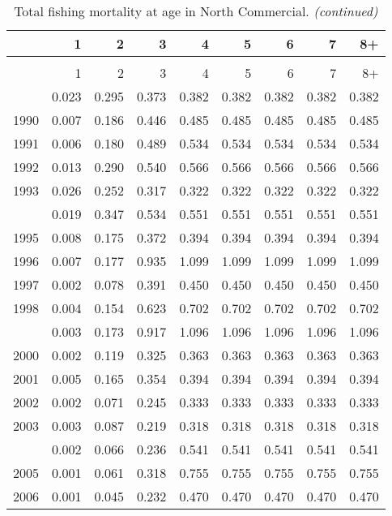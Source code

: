 \documentclass[
]{article}
\begin{document}
\begin{longtable}[t]{lrrrrrrrr}
\caption{\label{tab:North_Commercial-fleet-FAA-table}Total fishing mortality at age in North Commercial.}\\
\toprule
  & 1 & 2 & 3 & 4 & 5 & 6 & 7 & 8+\\
\midrule
\endfirsthead
\caption[]{Total fishing mortality at age in North Commercial. \textit{(continued)}}\\
\toprule
  & 1 & 2 & 3 & 4 & 5 & 6 & 7 & 8+\\
\midrule
\endhead

\endfoot
\bottomrule
\endlastfoot
1989 & 0.023 & 0.295 & 0.373 & 0.382 & 0.382 & 0.382 & 0.382 & 0.382\\
1990 & 0.007 & 0.186 & 0.446 & 0.485 & 0.485 & 0.485 & 0.485 & 0.485\\
1991 & 0.006 & 0.180 & 0.489 & 0.534 & 0.534 & 0.534 & 0.534 & 0.534\\
1992 & 0.013 & 0.290 & 0.540 & 0.566 & 0.566 & 0.566 & 0.566 & 0.566\\
1993 & 0.026 & 0.252 & 0.317 & 0.322 & 0.322 & 0.322 & 0.322 & 0.322\\
\addlinespace
1994 & 0.019 & 0.347 & 0.534 & 0.551 & 0.551 & 0.551 & 0.551 & 0.551\\
1995 & 0.008 & 0.175 & 0.372 & 0.394 & 0.394 & 0.394 & 0.394 & 0.394\\
1996 & 0.007 & 0.177 & 0.935 & 1.099 & 1.099 & 1.099 & 1.099 & 1.099\\
1997 & 0.002 & 0.078 & 0.391 & 0.450 & 0.450 & 0.450 & 0.450 & 0.450\\
1998 & 0.004 & 0.154 & 0.623 & 0.702 & 0.702 & 0.702 & 0.702 & 0.702\\
\addlinespace
1999 & 0.003 & 0.173 & 0.917 & 1.096 & 1.096 & 1.096 & 1.096 & 1.096\\
2000 & 0.002 & 0.119 & 0.325 & 0.363 & 0.363 & 0.363 & 0.363 & 0.363\\
2001 & 0.005 & 0.165 & 0.354 & 0.394 & 0.394 & 0.394 & 0.394 & 0.394\\
2002 & 0.002 & 0.071 & 0.245 & 0.333 & 0.333 & 0.333 & 0.333 & 0.333\\
2003 & 0.003 & 0.087 & 0.219 & 0.318 & 0.318 & 0.318 & 0.318 & 0.318\\
\addlinespace
2004 & 0.002 & 0.066 & 0.236 & 0.541 & 0.541 & 0.541 & 0.541 & 0.541\\
2005 & 0.001 & 0.061 & 0.318 & 0.755 & 0.755 & 0.755 & 0.755 & 0.755\\
2006 & 0.001 & 0.045 & 0.232 & 0.470 & 0.470 & 0.470 & 0.470 & 0.470\\

\end{longtable}
\end{document}
